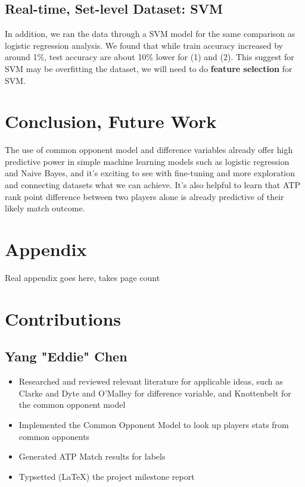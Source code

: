 \documentclass[paper=a4, fontsize=11pt]{scrartcl} %
\numberwithin{equation}{section} %
\numberwithin{figure}{section} %
\numberwithin{table}{section} %
\begin{document}
\subsection{Real-time, Set-level Dataset:  SVM}
In addition, we ran the data through a SVM model for the same comparison as logistic regression analysis.  We found that while train accuracy increased by around 1\%, test accuracy are about 10\%  lower for (1) and (2).  This suggest for SVM may be overfitting the dataset, we will need to do \textbf{feature selection} for SVM.

\section{Conclusion, Future Work}
The use of common opponent model and difference variables already offer high predictive power in simple machine learning models such as logistic regression and Naive Bayes, and it's exciting to see with fine-tuning and more exploration and connecting datasets what we can achieve. It's also helpful to learn that ATP rank point difference between two players alone is already predictive of their likely match outcome. 

\section{Appendix}
Real appendix goes here, takes page count

\section{Contributions}
\subsection{Yang "Eddie" Chen}
\begin{itemize}
\item Researched and reviewed relevant literature for applicable ideas, such as Clarke and Dyte \cite{Clarke2010} and O'Malley \cite{omalley} for difference variable, and Knottenbelt \cite{KNOTTENBELT20123820} for the common opponent model
\item Implemented the Common Opponent Model to look up players stats from common opponents
\item Generated ATP Match results for labels
\item Typsetted (\LaTeX) the project milestone report
\end{itemize}
\end{document}
